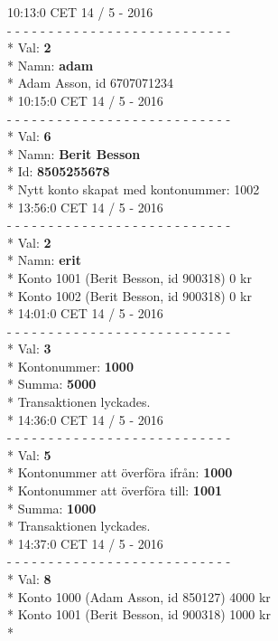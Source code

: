 \begin{multicols}{2}
10:13:0 CET 14 / 5 - 2016\\
- - - - - - - - - - - - - - - - - - - - - - - - - - -\\*
Val: \textbf{2}\\*
Namn: \textbf{adam}\\*
Adam Asson, id 6707071234\\*
10:15:0 CET 14 / 5 - 2016\\
- - - - - - - - - - - - - - - - - - - - - - - - - - -\\*
Val: \textbf{6}\\*
Namn: \textbf{Berit Besson}\\*
Id: \textbf{8505255678}\\*
Nytt konto skapat med kontonummer: 1002\\*
13:56:0 CET 14 / 5 - 2016\\
- - - - - - - - - - - - - - - - - - - - - - - - - - -\\*
Val: \textbf{2}\\*
Namn: \textbf{erit}\\*
Konto 1001 (Berit Besson, id 900318) 0 kr\\*
Konto 1002 (Berit Besson, id 900318) 0 kr\\*
14:01:0 CET 14 / 5 - 2016\\
- - - - - - - - - - - - - - - - - - - - - - - - - - -\\*
Val: \textbf{3}\\*
Kontonummer: \textbf{1000}\\*
Summa: \textbf{5000}\\*
Transaktionen lyckades.\\*
14:36:0 CET 14 / 5 - 2016\\
- - - - - - - - - - - - - - - - - - - - - - - - - - -\\*
Val: \textbf{5}\\*
Kontonummer att överföra ifrån: \textbf{1000}\\*
Kontonummer att överföra till: \textbf{1001}\\*
Summa: \textbf{1000}\\*
Transaktionen lyckades.\\*
14:37:0 CET 14 / 5 - 2016\\
- - - - - - - - - - - - - - - - - - - - - - - - - - -\\*
Val: \textbf{8}\\*
Konto 1000 (Adam Asson, id 850127) 4000 kr\\*
Konto 1001 (Berit Besson, id 900318) 1000 kr\\*

\end{multicols}
